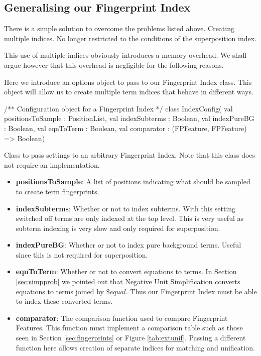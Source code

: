 \subsection{Generalising our Fingerprint Index}
\label{sec:config}

There is a simple solution to overcome the problems listed above. Creating multiple
indices. No longer restricted to the conditions of the superposition index.

This use of multiple indices obviously introduces a memory overhead. We
shall argue however that this overhead is negligible for the following reasons.

Here we introduce an options object to pass to our Fingerprint Index class.
This object will allow us to create multiple term indices that behave in different
ways.

\begin{listing}[H]
\begin{scalacode}
/** Configuration object for a Fingerprint Index */
class IndexConfig(
  val positionsToSample : PositionList,
  val indexSubterms     : Boolean,
  val indexPureBG       : Boolean,
  val eqnToTerm         : Boolean,
  val comparator        : (FPFeature, FPFeature) => Boolean)
\end{scalacode}
\caption{Class to pass settings to an arbitrary Fingerprint Index. Note that
this class does not require an implementation.}
\label{lst:subterms}
\end{listing}

\begin{itemize}
\item \textbf{positionsToSample}: A list of positions indicating what should be sampled
to create term fingerprints.
\item \textbf{indexSubterms}: Whether or not to index subterms. With this setting switched
off terms are only indexed at the top level. This is very useful as subterm indexing
is very slow and only required for superposition.
\item \textbf{indexPureBG}: Whether or not to index pure background terms. Useful
since this is not required for superposition.
\item \textbf{eqnToTerm}: Whether or not to convert equations to terms. In Section
\ref{sec:simpprob} we pointed out that Negative Unit Simplification
converts equations to terms joined by $\$equal$. Thus our Fingerprint Index
must be able to index these converted terms.
\item \textbf{comparator}: The comparison function used to compare Fingerprint Features.
This function must implement a comparison table such as those seen in Section 
\ref{sec:fingerprints} or Figure \ref{tab:extunif}. Passing a different
function here allows creation of separate indices for matching and unification.
\end{itemize}


